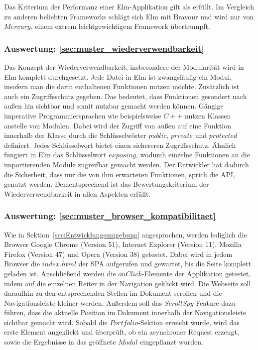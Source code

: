 Das Kriterium der Performanz einer Elm-Applikation gilt als erfüllt. Im Vergleich zu anderen beliebten Frameworks schlägt sich Elm mit Bravour und wird nur von $Mercury$, einem extrem leichtgewichtigem Framework übertrumpft.

\subsubsection{Auswertung: \ref{sec:muster_wiederverwendbarkeit} }
Das Konzept der Wiederverwendbarkeit, insbesondere der Modularität wird in Elm komplett durchgesetzt. Jede Datei in Elm ist zwangsläufig ein Modul, insofern man die darin enthaltenen Funktionen nutzen möchte. Zusätzlich ist auch ein Zugriffsschutz gegeben. Das bedeutet, dass Funktionen gesondert nach außen hin sichtbar und somit nutzbar gemacht werden können. Gängige imperative Programmiersprachen wie beispielsweise $C++$ nutzen Klassen anstelle von Modulen. Dabei wird der Zugriff von außen auf eine Funktion innerhalb der Klasse durch die Schlüsselwörter $public$, $private$ und $protected$ definiert. Jedes Schlüsselwort bietet einen sichereren Zugriffsschutz. Ähnlich fungiert in Elm das Schlüsselwort $exposing$, wodurch einzelne Funktionen an die importierenden Module zugreifbar gemacht werden. Der Entwickler hat dadurch die Sicherheit, dass nur die von ihm erwarteten Funktionen, sprich die \ac{API}, genutzt werden. Dementsprechend ist das Bewertungskriterium der Wiederverwendbarkeit in allen Aspekten erfüllt.


\subsubsection{Auswertung: \ref{sec:muster_browser_kompatibilitaet} }
Wie in Sektion~\ref{sec:Entwicklungsumgebung} angesprochen, werden lediglich die Browser Google Chrome (Version 51), Internet Explorer (Version 11), Mozilla Firefox (Version 47) und Opera (Version 38) getestet. Dabei wird in jedem Browser die $index.html$ der \ac{SPA} aufgerufen und gewartet, bis die Seite komplett geladen ist. Anschließend werden die $onClick$-Elemente der Applikation getestet, indem auf die einzelnen Reiter in der Navigation geklickt wird. Die Webseite soll daraufhin zu den entsprechenden Stellen im Dokument scrollen und die Navigationsleiste kleiner werden. Außerdem soll das $ScrollSpy$-Feature dazu führen, dass die aktuelle Position im Dokument innerhalb der Navigationsleiste sichtbar gemacht wird. Sobald die $Portfolio$-Sektion erreicht wurde, wird das erste Element angeklickt und überprüft, ob ein asynchroner Request erzeugt, sowie die Ergebnisse in das geöffnete $Modal$ eingepflanzt wurden.

